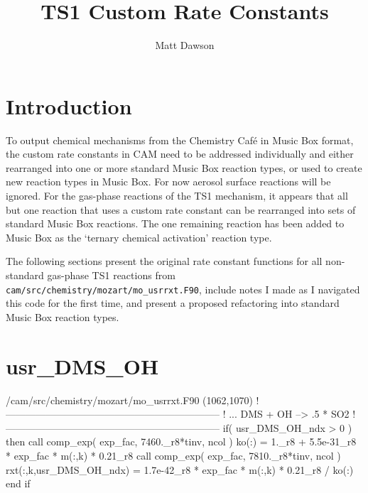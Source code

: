 \documentclass[titlepage]{article}
\begin{document}
\title{TS1 Custom Rate Constants}
\author{Matt Dawson}
\maketitle


\section{Introduction}

To output chemical mechanisms from the Chemistry Caf\'{e} in Music Box format, the custom rate constants in CAM need to be addressed individually and either rearranged into one or more standard Music Box reaction types, or used to create new reaction types in Music Box. For now aerosol surface reactions will be ignored. For the gas-phase reactions of the TS1 mechanism, it appears that all but one reaction that uses a custom rate constant can be rearranged into sets of standard Music Box reactions. The one remaining reaction has been added to Music Box as the `ternary chemical activation' reaction type.

The following sections present the original rate constant functions for all non-standard gas-phase TS1 reactions from \verb>cam/src/chemistry/mozart/mo_usrrxt.F90>, include notes I made as I navigated this code for the first time, and present a proposed refactoring into standard Music Box reaction types.



\section{usr\_DMS\_OH}

\begin{blockcode}[commandchars=\\\{\}]
\color{gray}/cam/src/chemistry/mozart/mo_usrrxt.F90 (1062,1070)
!-----------------------------------------------------------------
!       ... DMS + OH  --> .5 * SO2
!-----------------------------------------------------------------
       if( usr_DMS_OH_ndx > 0 ) then
          call comp_exp( exp_fac, 7460._r8*tinv, ncol )
          ko(:) = 1._r8 + 5.5e-31_r8 * exp_fac * m(:,k) * 0.21_r8
          call comp_exp( exp_fac, 7810._r8*tinv, ncol )
          rxt(:,k,usr_DMS_OH_ndx) = 1.7e-42_r8 * exp_fac * m(:,k) * 0.21_r8 / ko(:)
       end if
\end{blockcode}
\end{document}
